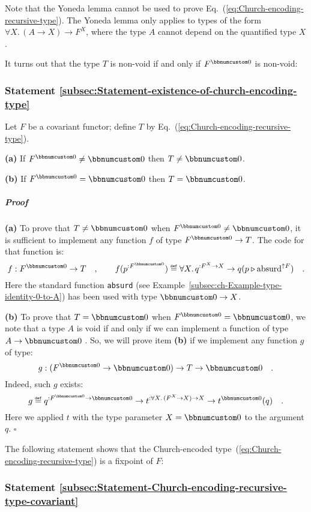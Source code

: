 Note that the Yoneda lemma cannot be used to prove Eq.~(\ref{eq:Church-encoding-recursive-type}).
The Yoneda lemma only applies to types of the form $\forall X.\,(A\rightarrow X)\rightarrow F^{X}$,
where the type $A$ cannot depend on the quantified type $X$.

It turns out that the type $T$ is non-void if and only if $F^{\bbnum 0}$
is non-void:

\subsubsection{Statement \label{subsec:Statement-existence-of-church-encoding-type}\ref{subsec:Statement-existence-of-church-encoding-type}}

Let $F$ be a covariant functor; define $T$ by Eq.~(\ref{eq:Church-encoding-recursive-type}).

\textbf{(a)} If $F^{\bbnum 0}\neq\bbnum 0$ then $T\neq\bbnum 0$. 

\textbf{(b)} If $F^{\bbnum 0}=\bbnum 0$ then $T=\bbnum 0$. 

\subparagraph{Proof}

\textbf{(a)} To prove that $T\neq\bbnum 0$ when $F^{\bbnum 0}\neq\bbnum 0$,
it is sufficient to implement any function $f$ of type $F^{\bbnum 0}\rightarrow T$.
The code for that function is:
\[
f:F^{\bbnum 0}\rightarrow T\quad,\quad\quad f(p^{:F^{\bbnum 0}})\triangleq\forall X.\,q^{:F^{X}\rightarrow X}\rightarrow q(p\triangleright\text{absurd}^{\uparrow F})\quad.
\]
Here the standard function \lstinline!absurd! (see Example~\ref{subsec:ch-Example-type-identity-0-to-A})
has been used with type $\bbnum 0\rightarrow X$.

\textbf{(b)} To prove that $T=\bbnum 0$ when $F^{\bbnum 0}=\bbnum 0$,
we note that a type $A$ is void if and only if we can implement a
function of type $A\rightarrow\bbnum 0$ . So, we will prove item
\textbf{(b)} if we implement any function $g$ of type:
\[
g:(F^{\bbnum 0}\rightarrow\bbnum 0)\rightarrow T\rightarrow\bbnum 0\quad.
\]
Indeed, such $g$ exists:
\[
g\triangleq q^{:F^{\bbnum 0}\rightarrow\bbnum 0}\rightarrow t^{:\forall X.\,(F^{X}\rightarrow X)\rightarrow X}\rightarrow t^{\bbnum 0}(q)\quad.
\]
Here we applied $t$ with the type parameter $X=\bbnum 0$ to the
argument $q$. $\square$

The following statement shows that the Church-encoded type~(\ref{eq:Church-encoding-recursive-type})
is a fixpoint of $F$:

\subsubsection{Statement \label{subsec:Statement-Church-encoding-recursive-type-covariant}\ref{subsec:Statement-Church-encoding-recursive-type-covariant}}

